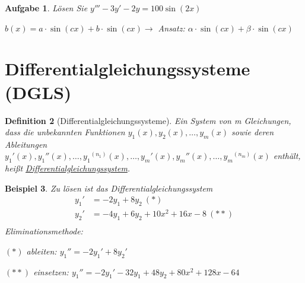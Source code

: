 \documentclass[12pt,a4paper]{scrreprt}
\newtheorem{defi}{Definition}[section]
\newtheorem{beispiel}[defi]{Beispiel}
\newtheorem{aufg}[defi]{Aufgabe}
\begin{document}
	 \begin{aufg}
		 Lösen Sie $y'''-3y'-2y=100\sin(2x)$

		 $b(x)=a \cdot \sin(cx) + b \cdot \sin(cx) \to$ Ansatz: $\alpha \cdot \sin(cx) + \beta \cdot \sin(cx)$
	 \end{aufg}

	 \section{Differentialgleichungssysteme (DGLS)}

	 \begin{defi}[Differentialgleichungssysteme]
		 Ein System von m Gleichungen, dass die unbekannten Funktionen $y_1(x),y_2(x),\dots,y_m(x)$ sowie deren Ableitungen ${y_1}'(x),{y_1}''(x),\dots,{y_1}^{(n_1)}(x),\dots,{y_m}'(x),{y_m}''(x),\dots,{y_m}^{(n_m)}(x)$ enthält, heißt \underline{Differentialgleichungssystem}.
	 \end{defi}

	 \begin{beispiel}
		 Zu lösen ist das Differentialgleichungssystem
		 \begin{align*}
			 {y_1}' &= -2y_1+8y_2\ (*) \\
			 {y_2}' &= -4y_1+6y_2+10x^2+16x-8\ (**) \\
		 \end{align*}
		 Eliminationsmethode:

		 $(*)$ ableiten: ${y_1}'' = -2{y_1}'+8{y_2}'$

		 $(**)$ einsetzen: ${y_1}'' = -2{y_1}'-32y_1+48y_2+80x^2+128x-64$
	 \end{beispiel}
\end{document}

